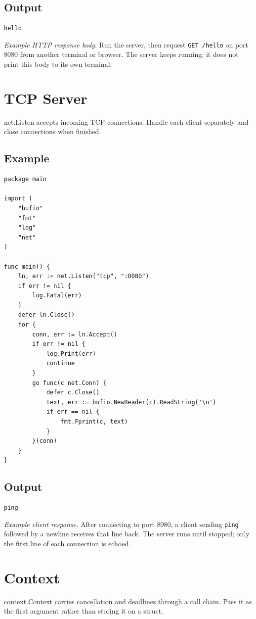 \documentclass[10pt,oneside]{article}
\newcommand{\sectionline}{\par\vspace{4pt}{\color{rule}\hrule height .5pt}\vspace{7pt}\color{ink}\noindent}
\begin{document}
\subsection*{Output}
\begin{lstlisting}[style=terminal]
hello
\end{lstlisting}
\emph{Example HTTP response body.} Run the server, then request \texttt{GET /hello} on port 8080 from another terminal or browser. The server keeps running; it does not print this body to its own terminal.
\clearpage
\section{TCP Server}
\sectionline
net.Listen accepts incoming TCP connections. Handle each client separately and close connections when finished.\par
\subsection*{Example}
\begin{lstlisting}[style=gocode]
package main

import (
	"bufio"
	"fmt"
	"log"
	"net"
)

func main() {
	ln, err := net.Listen("tcp", ":8080")
	if err != nil {
		log.Fatal(err)
	}
	defer ln.Close()
	for {
		conn, err := ln.Accept()
		if err != nil {
			log.Print(err)
			continue
		}
		go func(c net.Conn) {
			defer c.Close()
			text, err := bufio.NewReader(c).ReadString('\n')
			if err == nil {
				fmt.Fprint(c, text)
			}
		}(conn)
	}
}
\end{lstlisting}


\subsection*{Output}
\begin{lstlisting}[style=terminal]
ping
\end{lstlisting}
\emph{Example client response.} After connecting to port 8080, a client sending \texttt{ping} followed by a newline receives that line back. The server runs until stopped; only the first line of each connection is echoed.
\clearpage
\section{Context}
\sectionline
context.Context carries cancellation and deadlines through a call chain. Pass it as the first argument rather than storing it on a struct.\par
\end{document}
